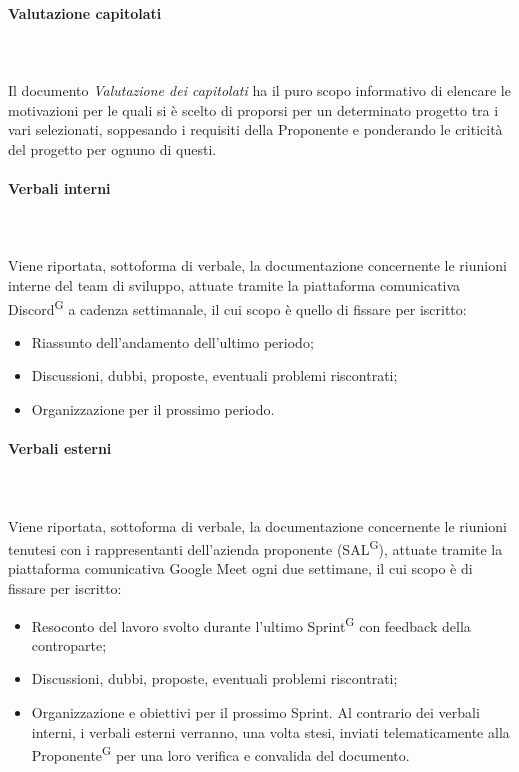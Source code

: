 \documentclass[8pt]{article}
\newcommand{\glossterm}[1]{#1\textsuperscript{G}} %
\newcommand{\subsubsubsection}[1]{\paragraph{#1}\mbox{}\\}
\begin{document}
\subsubsubsection{Valutazione capitolati}\\
Il documento \textit{Valutazione dei capitolati} ha il puro scopo informativo di elencare le
motivazioni per le quali si è scelto di proporsi per un determinato progetto tra i vari selezionati,
soppesando i requisiti della Proponente e ponderando le criticità del progetto per ognuno di questi.  
\subsubsubsection{Verbali interni}\\
Viene riportata, sottoforma di verbale, la documentazione concernente le riunioni interne del team
di sviluppo, attuate tramite la piattaforma comunicativa \glossterm{Discord} a cadenza settimanale,
il cui scopo è quello di fissare per iscritto:
\begin{itemize}
    \item Riassunto dell'andamento dell'ultimo periodo;
    \item Discussioni, dubbi, proposte, eventuali problemi riscontrati;
    \item Organizzazione per il prossimo periodo.
\end{itemize}
\subsubsubsection{Verbali esterni}\\
Viene riportata, sottoforma di verbale, la documentazione concernente le riunioni tenutesi con i
rappresentanti dell'azienda proponente (\glossterm{SAL}), attuate tramite la piattaforma comunicativa Google Meet ogni due settimane, il cui scopo è di fissare per iscritto:
\begin{itemize}
    \item Resoconto del lavoro svolto durante l'ultimo \glossterm{Sprint} con feedback della controparte;
    \item Discussioni, dubbi, proposte, eventuali problemi riscontrati;
    \item Organizzazione e obiettivi per il prossimo Sprint.
Al contrario dei verbali interni, i verbali esterni verranno, una volta stesi, inviati
        telematicamente alla \glossterm{Proponente} per una loro verifica e convalida del documento.
\end{itemize} 
\end{document}
